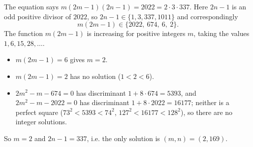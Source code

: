The equation says $m(2m-1)(2n-1)=2022=2\cdot3\cdot337$. Here $2n-1$ is an odd positive divisor of $2022$, so $2n-1\in\{1,3,337,1011\}$ and correspondingly
\[m(2m-1)\in\{2022,\ 674,\ 6,\ 2\}.\]
The function $m(2m-1)$ is increasing for positive integers $m$, taking the values $1,6,15,28,\dots$.
\begin{itemize}
\item $m(2m-1)=6$ gives $m=2$.
\item $m(2m-1)=2$ has no solution ($1<2<6$).
\item $2m^2-m-674=0$ has discriminant $1+8\cdot674=5393$, and $2m^2-m-2022=0$ has discriminant $1+8\cdot2022=16177$; neither is a perfect square ($73^2<5393<74^2$, $127^2<16177<128^2$), so there are no integer solutions.
\end{itemize}
So $m=2$ and $2n-1=337$, i.e. the only solution is $\boxed{(m,n)=(2,169)}$.
